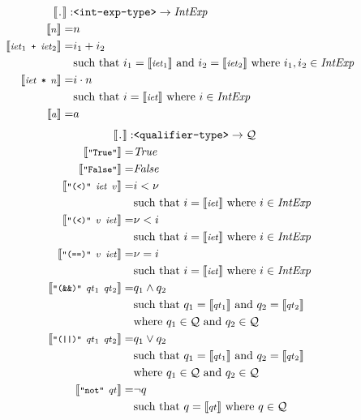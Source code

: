 \documentclass[]{scrbook}
\newcommand{\mf}[1]{\text{\texttt{#1}}}
\newcommand{\semantic}[1]{\llbracket \text{\footnotesize\texttt{#1}} \rrbracket}
\theoremstyle{definition}
\theoremstyle{definition}
\theoremstyle{definition}
\theoremstyle{remark}
\begin{document}
\[
\begin{aligned}
\semantic{.}:&\mf{<int-exp-type>}\to\mathit{IntExp}\\
\semantic{$n$} = & n\\
\semantic{$\mathit{iet}_1 \ \mf{+} \ \mathit{iet}_2$} = & i_1 + i_2\\
    &\text{such that } i_1 = \semantic{$\mathit{iet}_1$} \text{ and } i_2 = \semantic{$\mathit{iet}_2$} \text{ where } i_1,i_2\in\mathit{IntExp}\\
\semantic{$\mathit{iet} \ \mf{*} \ n$} = & i \cdot n\\
    &\text{such that } i = \semantic{$\mathit{iet}$}\text{ where } i\in\mathit{IntExp}\\
\semantic{$a$} = & a
\end{aligned}
\] \[
\begin{aligned}
\semantic{.}:&\mf{<qualifier-type>}\to\mathcal{Q}\\
\semantic{"True"} = & \mathit{True}\\
\semantic{"False"} = & \mathit{False}\\
\semantic{"(<)" $\mathit{iet} \ v$} = & i < \nu\\
    &\text{such that } i = \semantic{$\mathit{iet}$}\text{ where } i\in\mathit{IntExp}\\
\semantic{$\mf{"(<)"} \ v \ \mathit{iet}$} = &\nu < i\\
    &\text{such that } i = \semantic{$\mathit{iet}$}\text{ where } i\in\mathit{IntExp}\\
\semantic{$\mf{"(==)"} \ v\ \mathit{iet}$} = &\nu = i\\
    &\text{such that } i = \semantic{$\mathit{iet}$}\text{ where } i\in\mathit{IntExp}\\
\semantic{$\mf{"(\&\&)"} \ qt_1 \ qt_2$} = &q_1 \land q_2\\
    &\text{such that } q_1 =  \semantic{$qt_1$}\text{ and } q_2 =\semantic{$qt_2$}\\
    &\text{where } q_1\in\mathcal{Q}\text{ and } q_2\in\mathcal{Q}\\
\semantic{$\mf{"(||)"}\ qt_1\ qt_2$} = &q_1 \lor q_2\\
    &\text{such that } q_1 = \semantic{$qt_1$}\text{ and } q_2 = \semantic{$qt_2$}\\
    &\text{where } q_1\in\mathcal{Q}\text{ and } q_2\in\mathcal{Q}\\
\semantic{$\mf{"not"} \ qt$} = &\neg q\\
    &\text{such that } q = \semantic{$qt$}\text{ where } q\in\mathcal{Q}

\end{aligned}\]
\end{document}
